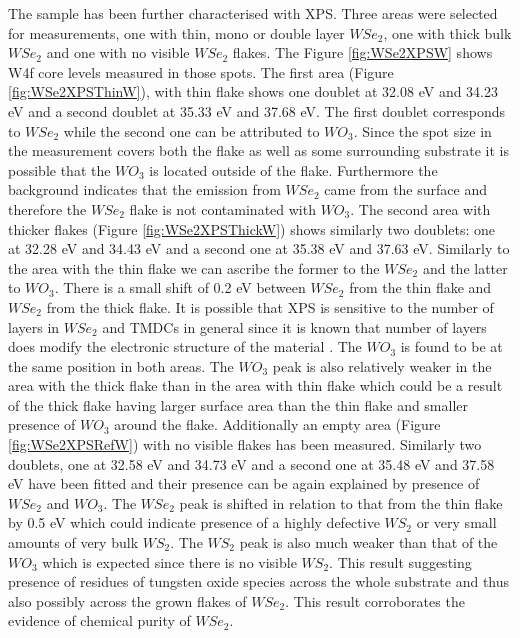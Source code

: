 The sample has been further characterised with XPS. Three areas were selected for measurements, one with thin, mono or double layer $WSe_2$, one with thick bulk $WSe_2$ and one with no visible $WSe_2$ flakes. The Figure \ref{fig:WSe2XPSW} shows W4f core levels measured in those spots. The first area (Figure \ref{fig:WSe2XPSThinW}), with thin flake shows one doublet at 32.08 eV and 34.23 eV and a second doublet at 35.33 eV and 37.68 eV. The first doublet corresponds to $WSe_2$ while the second one can be attributed to $WO_3$. Since the spot size in the measurement covers both the flake as well as some surrounding substrate it is possible that the $WO_3$ is located outside of the flake. Furthermore the background indicates that the emission from $WSe_2$ came from the surface and therefore the $WSe_2$ flake is not contaminated with $WO_3$. 
The second area with thicker flakes (Figure \ref{fig:WSe2XPSThickW}) shows similarly two doublets: one at 32.28 eV and 34.43 eV and a second one at 35.38 eV and 37.63 eV. Similarly to the area with  the thin flake we can ascribe the former to the $WSe_2$ and the latter to $WO_3$. There is a small shift of 0.2 eV between $WSe_2$ from the thin flake and $WSe_2$ from the thick flake. It is possible that XPS is sensitive to the number of layers in $WSe_2$ and TMDCs in general since it is known that number of layers does modify the electronic structure of the material \cite{ElectronicsAndOptoelectronicsOfTwo-dimensionalTransitionMetalDichalcogenides}. The $WO_3$ is found to be at the same position in both areas. The $WO_3$ peak is also relatively weaker in the area with the thick flake than in the area with thin flake which could be a result of the thick flake having larger surface area than the thin flake and smaller presence of $WO_3$ around the flake. 
Additionally an empty area (Figure \ref{fig:WSe2XPSRefW}) with no visible flakes has been measured. Similarly two doublets, one at 32.58 eV and 34.73 eV and a second one at 35.48 eV and 37.58 eV have been fitted and their presence can be again explained by presence of $WSe_2$ and $WO_3$. The $WSe_2$ peak is shifted in relation to that from the thin flake by 0.5 eV which could indicate presence of a highly defective $WS_2$ or very small amounts of very bulk $WS_2$. The $WS_2$ peak is also much weaker than that of the $WO_3$ which is expected since there is no visible $WS_2$. This result suggesting presence of residues of tungsten oxide species across the whole substrate and thus also possibly across the grown flakes of $WSe_2$. This result corroborates the evidence of chemical purity of $WSe_2$.

